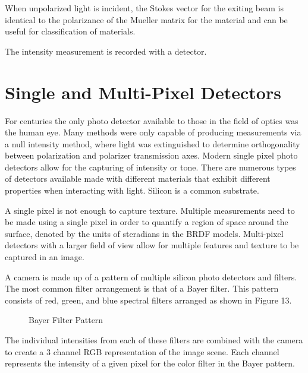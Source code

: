 When unpolarized light is incident, the Stokes vector for the exiting beam is identical to the polarizance of the Mueller matrix for the material and can be useful for classification of materials.

The intensity measurement is recorded with a detector.

\section{Single and Multi-Pixel Detectors}
For centuries the only photo detector available to those in the field of optics was the human eye.  Many methods were only capable of producing measurements via a null intensity method, where light was extinguished to determine orthogonality between polarization and polarizer transmission axes.  Modern single pixel photo detectors allow for the capturing of intensity or tone.  There are numerous types of detectors available made with different materials that exhibit different properties when interacting with light.  Silicon is a common substrate.

A single pixel is not enough to capture texture.  Multiple measurements need to be made using a single pixel in order to quantify a region of space around the surface, denoted by the units of steradians in the BRDF models.  Multi-pixel detectors with a larger field of view allow for multiple features and texture to be captured in an image.

A camera is made up of a pattern of multiple silicon photo detectors and filters.  The most common filter arrangement is that of a Bayer filter.  This pattern consists of red, green, and blue spectral filters arranged as shown in Figure 13.
\begin{figure}[!htb]
    \begin{center}
    \end{center}
    \caption{Bayer Filter Pattern}
    \label{fig:polarization}
\end{figure}

The individual intensities from each of these filters are combined with the camera to create a 3 channel RGB representation of the image scene.  Each channel represents the intensity of a given pixel for the color filter in the Bayer pattern.

